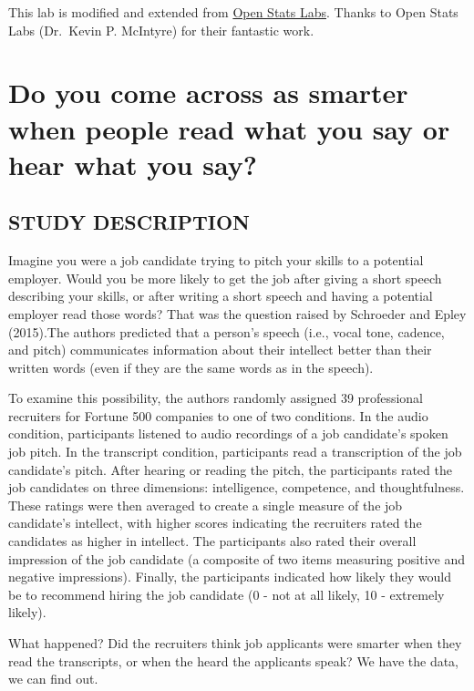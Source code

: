 \documentclass[
]{book}
\begin{document}
This lab is modified and extended from \href{https://sites.trinity.edu/osl}{Open Stats Labs}. Thanks to Open Stats Labs (Dr.~Kevin P. McIntyre) for their fantastic work.

\hypertarget{do-you-come-across-as-smarter-when-people-read-what-you-say-or-hear-what-you-say}{%
\section{Do you come across as smarter when people read what you say or hear what you say?}\label{do-you-come-across-as-smarter-when-people-read-what-you-say-or-hear-what-you-say}}

\hypertarget{study-description-1}{%
\subsection{STUDY DESCRIPTION}\label{study-description-1}}

Imagine you were a job candidate trying to pitch your skills to a potential employer. Would you be more likely to get the job after giving a short speech describing your skills, or after writing a short speech and having a potential employer read those words? That was the question raised by Schroeder and Epley (2015).The authors predicted that a person's speech (i.e., vocal tone, cadence, and pitch) communicates information about their intellect better than their written words (even if they are the same words as in the speech).

To examine this possibility, the authors randomly assigned 39 professional recruiters for Fortune 500 companies to one of two conditions. In the audio condition, participants listened to audio recordings of a job candidate's spoken job pitch. In the transcript condition, participants read a transcription of the job candidate's pitch. After hearing or reading the pitch, the participants rated the job candidates on three dimensions: intelligence, competence, and thoughtfulness. These ratings were then averaged to create a single measure of the job candidate's intellect, with higher scores indicating the recruiters rated the candidates as higher in intellect. The participants also rated their overall impression of the job candidate (a composite of two items measuring positive and negative impressions). Finally, the participants indicated how likely they would be to recommend hiring the job candidate (0 - not at all likely, 10 - extremely likely).

What happened? Did the recruiters think job applicants were smarter when they read the transcripts, or when the heard the applicants speak? We have the data, we can find out.
\end{document}
